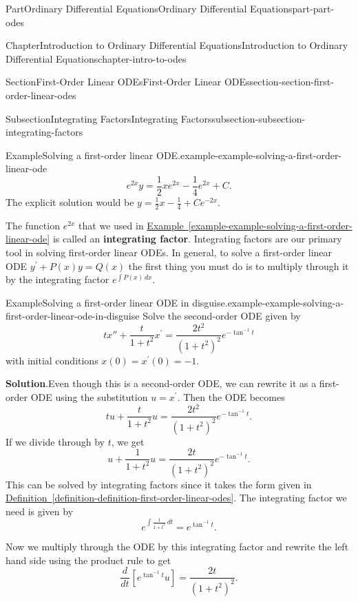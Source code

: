 \documentclass[twoside,10pt,]{book}
\newcommand{\blocktitlefont}{\relax}
\newcommand{\xreffont}{\relax}
\newcommand{\terminology}[1]{\textbf{#1}}
\numberwithin{equation}{part}
\newcommand{\dv}[3][]{\dfrac{d^{#1} #2}{d #3^{#1}}}
\begin{document}
\begin{partptx}{Part}{Ordinary Differential Equations}{}{Ordinary Differential Equations}{}{}{part-part-odes}
\begin{chapterptx}{Chapter}{Introduction to Ordinary Differential Equations}{}{Introduction to Ordinary Differential Equations}{}{}{chapter-intro-to-odes}
\begin{sectionptx}{Section}{First-Order Linear ODEs}{}{First-Order Linear ODEs}{}{}{section-section-first-order-linear-odes}
\begin{subsectionptx}{Subsection}{Integrating Factors}{}{Integrating Factors}{}{}{subsection-subsection-integrating-factors}
\begin{example}{Example}{Solving a first-order linear ODE.}{example-example-solving-a-first-order-linear-ode}
\begin{equation*}
e^{2x}y = \frac{1}{2}xe^{2x} - \frac{1}{4}e^{2x}+C.
\end{equation*}
The explicit solution would be \(y = \frac{1}{2}x - \frac{1}{4} + Ce^{-2x}\).%
\end{example}
The function \(e^{2x}\) that we used in \hyperref[example-example-solving-a-first-order-linear-ode]{Example~{\xreffont\ref{example-example-solving-a-first-order-linear-ode}}} is called an \terminology{integrating factor}. Integrating factors are our primary tool in solving first-order linear ODEs. In general, to solve a first-order linear ODE \(y^\prime +P(x)y=Q(x)\) the first thing you must do is to multiply through it by the integrating factor \(e^{\int P(x)\,dx}\).%
\begin{example}{Example}{Solving a first-order linear ODE in disguise.}{example-example-solving-a-first-order-linear-ode-in-disguise}%
Solve the second-order ODE given by%
\begin{equation*}
tx''+\frac{t}{1+t^{2}}x^\prime = \frac{2t^{2}}{(1+t^{2})^{2}}e^{-\tan^{-1}t}
\end{equation*}
with initial conditions \(x(0) = x^\prime(0) = -1.\)%
\par\smallskip%
\noindent\textbf{\blocktitlefont Solution}.\hypertarget{solution-example-solving-a-first-order-linear-ode-in-disguise-c}{}\quad{}Even though this is a second-order ODE, we can rewrite it as a first-order ODE using the substitution \(u = x^\prime\). Then the ODE becomes%
\begin{equation*}
tu+\frac{t}{1+t^{2}}u = \frac{2t^{2}}{(1+t^{2})^{2}}e^{-\tan^{-1}t}.
\end{equation*}
If we divide through by \(t\), we get%
\begin{equation*}
u+\frac{1}{1+t^{2}}u = \frac{2t}{(1+t^{2})^{2}}e^{-\tan^{-1}t}.
\end{equation*}
This can be solved by integrating factors since it takes the form given in \hyperref[definition-definition-first-order-linear-odes]{Definition~{\xreffont\ref{definition-definition-first-order-linear-odes}}}. The integrating factor we need is given by%
\begin{equation*}
e^{\int \frac{1}{1+t^{2}}\,dt} = e^{\tan^{-1}t}.
\end{equation*}
%
\par
Now we multiply through the ODE by this integrating factor and rewrite the left hand side using the product rule to get%
\begin{equation*}
\dv{}{t}[e^{\tan^{-1}t}u] = \frac{2t}{(1+t^{2})^{2}}.

\end{equation*}
\end{example}
\end{subsectionptx}
\end{sectionptx}
\end{chapterptx}
\end{partptx}
\end{document}
